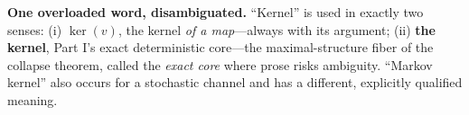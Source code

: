 \textbf{One overloaded word, disambiguated.} ``Kernel'' is used in exactly two senses: (i) \(\ker(v)\), the kernel \emph{of a map}---\hspace{0pt}always with its argument; (ii) \textbf{the kernel}, Part I's exact deterministic core---\hspace{0pt}the maximal-structure fiber of the collapse theorem, called the \emph{exact core} where prose risks ambiguity. ``Markov kernel'' also occurs for a stochastic channel and has a different, explicitly qualified meaning.
